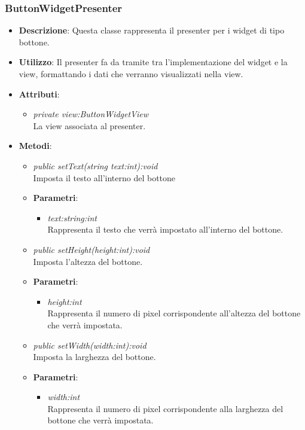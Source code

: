 \subsubsection{ButtonWidgetPresenter}
\begin{itemize}
\item \textbf{Descrizione}: Questa classe rappresenta il presenter per i widget di tipo bottone.
\item \textbf{Utilizzo}: Il presenter fa da tramite tra l'implementazione del widget e la view, formattando i dati che verranno visualizzati nella view.
\item \textbf{Attributi}:
	\begin{itemize}
	\item \textit{private view:ButtonWidgetView}\\
	La view associata al presenter.
	\end{itemize}
\item \textbf{Metodi}:
	\begin{itemize}
	\item \textit{public setText(string text:int):void}\\
	Imposta il testo all'interno del bottone
		\item{\textbf{Parametri}: \begin{itemize}
		\item \textit{text:string:int}\\
		Rappresenta il testo che verrà impostato all'interno del bottone.
		\end{itemize}}
	\item \textit{public setHeight(height:int):void}\\
	Imposta l'altezza del bottone.
		\item{\textbf{Parametri}: \begin{itemize}
		\item \textit{height:int}\\
		Rappresenta il numero di pixel corrispondente all'altezza del bottone che verrà impostata.
		\end{itemize}}
	\item \textit{public setWidth(width:int):void}\\
	Imposta la larghezza del bottone.
		\item{\textbf{Parametri}: \begin{itemize}
		\item \textit{width:int}\\
		Rappresenta il numero di pixel corrispondente alla larghezza del bottone che verrà impostata.

\end{itemize}}
\end{itemize}
\end{itemize}
